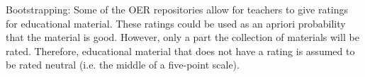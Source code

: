 %
%

Bootstrapping:
Some of the OER repositories allow for teachers to give ratings for educational
material. These ratings could be used as an apriori probability that the
material is good. However, only a part the collection of materials will be
rated. Therefore, educational material that does not have a rating is assumed
to be rated neutral (i.e. the middle of a five-point scale).
